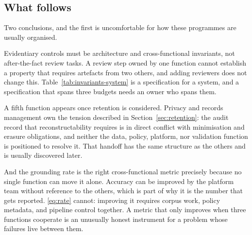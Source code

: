 \subsection{What follows}

Two conclusions, and the first is uncomfortable for how these programmes are
usually organised.

Evidentiary controls must be architecture and cross-functional invariants, not
after-the-fact review tasks. A review step owned by one function cannot establish a
property that requires artefacts from two others, and adding reviewers does not
change this. Table~\ref{tab:invariants-system} is a specification for a system, and
a specification that spans three budgets needs an owner who spans them.

A fifth function appears once retention is considered. Privacy and records
management own the tension described in Section~\ref{sec:retention}: the audit record
that reconstructability requires is in direct conflict with minimisation and erasure
obligations, and neither the data, policy, platform, nor validation function is
positioned to resolve it. That handoff has the same structure as the others and is
usually discovered later.

And the grounding rate is the right cross-functional metric precisely because no
single function can move it alone. Accuracy can be improved by the platform team
without reference to the others, which is part of why it is the number that gets
reported. \eqref{eq:rate} cannot: improving it requires corpus work, policy
metadata, and pipeline control together. A metric that only improves when three
functions cooperate is an unusually honest instrument for a problem whose failures
live between them.
